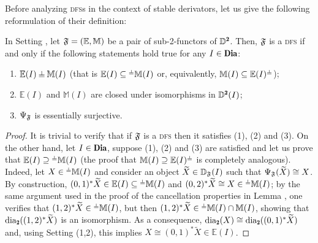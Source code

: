 Before analyzing \textsc{dfs}s in the context of stable derivators, let us give the following reformulation of their definition:

\begin{lemma}\label{easier_def_dfs}
In Setting , let $\mathfrak{F}=(\mathbb E,\mathbb M)$ be a pair of sub-2-functors of $\D^\due$. Then, $\mathfrak{F}$ is a \textsc{dfs} if and only if the following statements hold true for any $I\in \Dia$:
\begin{enumerate}
\item $\mathbb E(I)\corth \mathbb M(I)$ (that is $\mathbb E(I)\subseteq {}^{\corth} \mathbb M(I)$ or, equivalently, $\mathbb M(I)\subseteq  \mathbb E(I)^{\corth}$);
\item $\mathbb E(I)$ and $\mathbb M(I)$ are closed under isomorphisms in $\D^\due(I)$;%
\item $\Psi_{\mathfrak{F}}$ is essentially surjective.
\end{enumerate}
\end{lemma}
\begin{proof}
It is trivial to verify that if $\mathfrak{F}$ is a \textsc{dfs} then it satisfies (1), (2) and (3). On the other hand, let $I\in \Dia$, suppose (1), (2) and (3) are satisfied and let us prove that $\mathbb E(I)\supseteq {}^{\corth} \mathbb M(I)$ (the proof that $\mathbb M(I)\supseteq  \mathbb E(I)^{\corth}$ is completely analogous). Indeed, let $X\in{}^{\corth} \mathbb M(I)$ and consider an object $\widetilde X\in \mathbb{D}_{\mathfrak{F}}(I)$ such that $\Psi_{\mathfrak{F}}(\widetilde X)\cong X$. By construction, $(0,1)^*\widetilde X\in \mathbb E(I)\subseteq {}^{\corth}\mathbb M(I)$ and $(0,2)^*\widetilde X\cong X\in {}^{\corth}\mathbb M(I)$; by the same argument used in the proof of the cancellation properties in Lemma , one verifies that $(1,2)^*\widetilde X\in {}^{\corth}\mathbb M(I)$, but then $(1,2)^*\widetilde X\in {}^{\corth}\mathbb M(I)\cap \mathbb M(I)$, showing that $\dia_\due((1,2)^*\widetilde X)$ is an isomorphism. As a consequence, $\dia_\due(X)\cong \dia_\due((0,1)^*\widetilde X)$ and, using Setting (1,2), this implies $X\cong (0,1)^*\widetilde X\in \mathbb E(I)$.
\end{proof}


